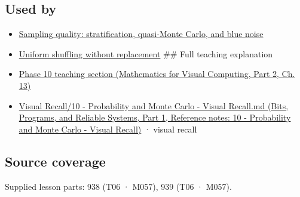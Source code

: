 \subsection{Used by}\label{appendix-daaf25bfd3a0-used-by}

\hypertarget{appendix-daaf25bfd3a0-used-by}{}

\begin{itemize}
\item
  \hyperref[appendix-9f693ffd82bc]{Sampling quality: stratification, quasi-Monte Carlo, and blue noise}
\item
  \hyperref[appendix-184fcc411663]{Uniform shuffling without replacement} \#\# Full teaching explanation
\item
  \href{../02-Mathematics-for-Visual-Computing-P02/main.pdf\#nameddest=02-foundations-ii-ch029-a-computer-produces-deterministic-pseudorandom-sequences}{Phase 10 teaching section (Mathematics for Visual Computing, Part 2, Ch. 13)}
\item
  \href{../01-Bits-Programs-and-Reliable-Systems-P01/main.pdf\#nameddest=appendix-cb5af353ef77}{Visual Recall/10 - Probability and Monte Carlo - Visual Recall.md (Bits, Programs, and Reliable Systems, Part 1, Reference notes: 10 - Probability and Monte Carlo - Visual Recall)} · visual recall
\end{itemize}

\subsection{Source coverage}\label{appendix-daaf25bfd3a0-source-coverage}

\hypertarget{appendix-daaf25bfd3a0-source-coverage}{}

Supplied lesson parts: 938 (T06 · M057), 939 (T06 · M057).
